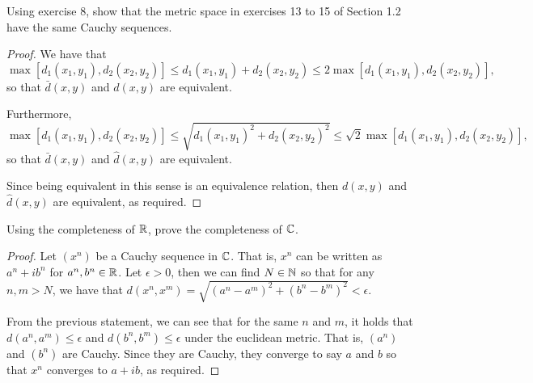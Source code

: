 \begin{exercise}{9}
Using exercise 8, show that the metric space in exercises 13 to 15 of Section 1.2 have the same Cauchy sequences.
\end{exercise}
\begin{proof}
We have that 
\[
\max[d_1(x_1,y_1),d_2(x_2,y_2)]
\leq d_1(x_1,y_1)+d_2(x_2,y_2)
\leq 2\max[d_1(x_1,y_1),d_2(x_2,y_2)],
\]
so that $\bar{d}(x,y)$ and $d(x,y)$ are equivalent.

Furthermore,
\[
\max[d_1(x_1,y_1),d_2(x_2,y_2)]
\leq \sqrt{d_1(x_1,y_1)^2+d_2(x_2,y_2)^2}
\leq \sqrt{2}\max[d_1(x_1,y_1),d_2(x_2,y_2)],
\]
so that $\bar{d}(x,y)$ and $\hat{d}(x,y)$ are equivalent.

Since being equivalent in this sense is an equivalence relation, then $d(x,y)$ and $\hat{d}(x,y)$ are equivalent, as required.
\end{proof}

\begin{exercise}{10}
Using the completeness of $\mathbb{R}$, prove the completeness of $\mathbb{C}$.
\end{exercise}
\begin{proof}
Let $(x^n)$ be a Cauchy sequence in $\mathbb{C}$. That is, $x^n$ can be written as $a^n+ib^n$ for $a^n,b^n\in\mathbb{R}$. Let $\epsilon>0$, then we can find $N\in\mathbb{N}$ so that for any $n,m>N$, we have that $d(x^n,x^m)=\sqrt{(a^n-a^m)^2+(b^n-b^m)^2}<\epsilon$. 

From the previous statement, we can see that for the same $n$ and $m$, it holds that $d(a^n,a^m)\leq \epsilon$ and $d(b^n,b^m)\leq \epsilon$ under the euclidean metric. That is, $(a^n)$ and $(b^n)$ are Cauchy. Since they are Cauchy, they converge to say $a$ and $b$ so that $x^n$ converges to $a+ib$, as required.
\end{proof}